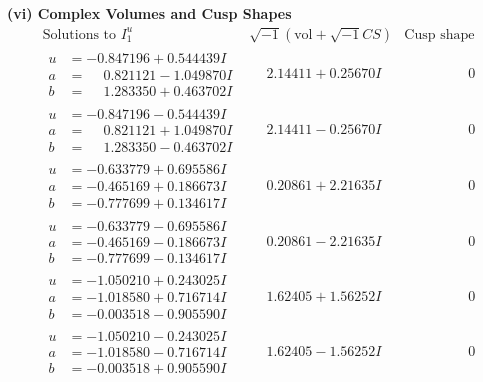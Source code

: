 \documentclass[1p]{elsarticle_modified}
\theoremstyle{definition}
\newcommand{\I}{\sqrt{-1}}
\begin{document}
\newpage\flushleft \textbf{(vi) Complex Volumes and Cusp Shapes}
$$\begin{array}{c|c|c}  
\text{Solutions to }I^u_{1}& \I (\text{vol} + \sqrt{-1}CS) & \text{Cusp shape}\\
 \hline 
\begin{aligned}
u &= -0.847196 + 0.544439 I \\
a &= \phantom{-}0.821121 - 1.049870 I \\
b &= \phantom{-}1.283350 + 0.463702 I\end{aligned}
 & \phantom{-}2.14411 + 0.25670 I & \phantom{-0.000000 } 0 \\ \hline\begin{aligned}
u &= -0.847196 - 0.544439 I \\
a &= \phantom{-}0.821121 + 1.049870 I \\
b &= \phantom{-}1.283350 - 0.463702 I\end{aligned}
 & \phantom{-}2.14411 - 0.25670 I & \phantom{-0.000000 } 0 \\ \hline\begin{aligned}
u &= -0.633779 + 0.695586 I \\
a &= -0.465169 + 0.186673 I \\
b &= -0.777699 + 0.134617 I\end{aligned}
 & \phantom{-}0.20861 + 2.21635 I & \phantom{-0.000000 } 0 \\ \hline\begin{aligned}
u &= -0.633779 - 0.695586 I \\
a &= -0.465169 - 0.186673 I \\
b &= -0.777699 - 0.134617 I\end{aligned}
 & \phantom{-}0.20861 - 2.21635 I & \phantom{-0.000000 } 0 \\ \hline\begin{aligned}
u &= -1.050210 + 0.243025 I \\
a &= -1.018580 + 0.716714 I \\
b &= -0.003518 - 0.905590 I\end{aligned}
 & \phantom{-}1.62405 + 1.56252 I & \phantom{-0.000000 } 0 \\ \hline\begin{aligned}
u &= -1.050210 - 0.243025 I \\
a &= -1.018580 - 0.716714 I \\
b &= -0.003518 + 0.905590 I\end{aligned}
 & \phantom{-}1.62405 - 1.56252 I & \phantom{-0.000000 } 0 \\ \hline\begin{aligned}

\end{aligned}
\end{array}$$
\end{document}
